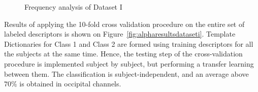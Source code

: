 \begin{figure}[h!]
\centering
{}
\caption[Power Spectral Density of the Dataset I]{Frequency analysis of Dataset I}
\label{fig:psd}
\end{figure}
   
Results of applying the 10-fold cross validation procedure on the entire set of labeled descriptors is shown on Figure~\ref{fig:alpharesultsdataseti}. Template Dictionaries for Class 1 and Class 2 are formed using training descriptors for all the subjects at the same time.  Hence, the testing step of the cross-validation procedure is implemented subject by subject, but performing a transfer learning between them. The classification is subject-independent, and an average above $70\%$ is obtained in occipital channels.
   
